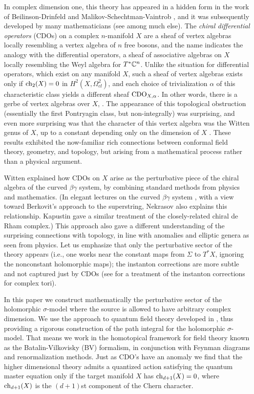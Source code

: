 \documentclass[10pt]{amsart}
\begin{document}
In complex dimension one, this theory has appeared in a hidden form in the work of Beilinson-Drinfeld and Malikov-Schechtman-Vaintrob \cite{BD,MSV}, and it was subsequently developed by many mathematicians (see \cite{KV,Cheung,Bressler} among much else). The {\em chiral differential operators} (CDOs) on a complex $n$-manifold $X$ are a sheaf of vertex algebras locally resembling a vertex algebra of $n$ free bosons, and the name indicates the analogy with the differential operators, a sheaf of associative algebras on $X$ locally resembling the Weyl algebra for $T^*\mathbb C^n$. Unlike the situation for differential operators, which exist on any manifold $X$, such a sheaf of vertex algebras exists only if ${\rm ch}_2(X) = 0$ in $H^2(X, \Omega^2_{cl})$, and each choice of trivialization $\alpha$ of this characteristic class yields a different sheaf ${\rm CDO}_{X,\alpha}$. In other words, there is a gerbe of vertex algebras over $X$, \cite{GMS}. The appearance of this topological obstruction (essentially the first Pontryagin class, but non-integrally) was surprising, and even more surprising was that the character of this vertex algebra was the Witten genus of $X$, up to a constant depending only on the dimension of $X$ \cite{BorLib}. These results exhibited the now-familiar rich connections between conformal field theory, geometry, and topology, but arising from a mathematical process rather than a physical argument. 

Witten \cite{WittenCDO} explained how CDOs on $X$ arise as the perturbative piece of the chiral algebra of the curved $\beta\gamma$ system, by combining standard methods from physics and mathematics. (In elegant lectures on the curved $\beta\gamma$ system \cite{Nek}, with a view toward Berkovit's approach to the superstring, Nekrasov also explains this relationship.  Kapustin \cite{KapCDR} gave a similar treatment of the closely-related chiral de Rham complex.) This approach also gave a different understanding of the surprising connections with topology, in line with anomalies and elliptic genera as seen from physics. 
Let us emphasize that only the perturbative sector of the theory appears (i.e., one works near the constant maps from $\Sigma$ to $T^*X$, ignoring the nonconstant holomorphic maps); the instanton corrections are more subtle and not captured just by CDOs (see \cite{KapOrlov} for a treatment of the instanton corrections for complex tori).

In this paper we construct mathematically the perturbative sector of the holomorphic $\sigma$-model where the source is allowed to have arbitrary complex dimension.
We use the approach to quantum field theory developed in \cite{CosBook, CG}, thus providing a rigorous construction of the path integral for the holomorphic $\sigma$-model. That means we work in the homotopical framework for field theory known as the Batalin-Vilkovisky (BV) formalism, in conjunction with Feynman diagrams and renormalization methods. 
Just as CDO's have an anomaly we find that the higher dimensional theory admits a quantized action satisfying the quantum master equation only if the target manifold $X$ has ${\rm ch}_{d+1}(X) = 0$, where ${\rm ch}_{d+1}(X)$ is the $(d+1)$st component of the Chern character.
\end{document}
